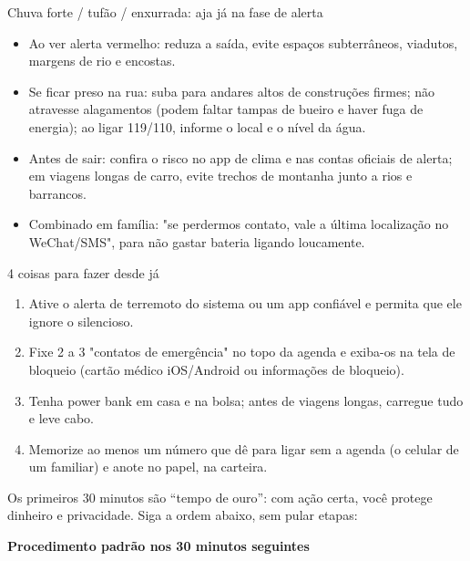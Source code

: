 \begin{tcbwarn}{Chuva forte / tufão / enxurrada: aja já na fase de alerta}
\begin{itemize}
  \item Ao ver alerta vermelho: reduza a saída, evite espaços subterrâneos, viadutos, margens de rio e encostas.
  \item Se ficar preso na rua: suba para andares altos de construções firmes; não atravesse alagamentos (podem faltar tampas de bueiro e haver fuga de energia); ao ligar 119/110, informe o local e o nível da água.
  \item Antes de sair: confira o risco no app de clima e nas contas oficiais de alerta; em viagens longas de carro, evite trechos de montanha junto a rios e barrancos.
  \item Combinado em família: "se perdermos contato, vale a última localização no WeChat/SMS", para não gastar bateria ligando loucamente.
\end{itemize}

\end{tcbwarn}

\begin{tcbpractice}{4 coisas para fazer desde já}
\begin{enumerate}
  \item Ative o alerta de terremoto do sistema ou um app confiável e permita que ele ignore o silencioso.
  \item Fixe 2 a 3 "contatos de emergência" no topo da agenda e exiba-os na tela de bloqueio (cartão médico iOS/Android ou informações de bloqueio).
  \item Tenha power bank em casa e na bolsa; antes de viagens longas, carregue tudo e leve cabo.
  \item Memorize ao menos um número que dê para ligar sem a agenda (o celular de um familiar) e anote no papel, na carteira.
\end{enumerate}

\end{tcbpractice}


Os primeiros 30 minutos são “tempo de ouro”: com ação certa, você protege dinheiro e privacidade. Siga a ordem abaixo, sem pular etapas:

\textbf{Procedimento padrão nos 30 minutos seguintes}\par

